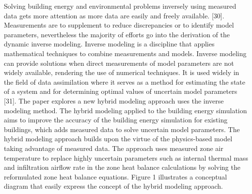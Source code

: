 Solving building energy and environmental problems inversely using measured data gets more attention as more data are easily and freely available. [30]. Measurements are to supplement to reduce discrepancies or to identify model parameters, nevertheless the majority of efforts go into the derivation of the dynamic inverse modeling. Inverse modeling is a discipline that applies mathematical techniques to combine measurements and models. Inverse modeling can provide solutions when direct measurements of model parameters are not widely available, rendering the use of numerical techniques. It is used widely in the field of data assimilation where it serves as a method for estimating the state of a system and for determining optimal values of uncertain model parameters [31]. 
The paper explores a new hybrid modeling approach uses the inverse modeling method. The hybrid modeling applied to the building energy simulation aims to improve the accuracy of the building energy simulation for existing buildings, which adds measured data to solve uncertain model parameters. The hybrid modeling approach builds upon the virtue of the physics-based model taking advantage of measured data. The approach uses measured zone air temperature to replace highly uncertain parameters such as internal thermal mass and infiltration airflow rate in the zone heat balance calculations by solving the reformulated zone heat balance equations. Figure 1 illustrates a conceptual diagram that easily express the concept of the hybrid modeling approach. 
 
